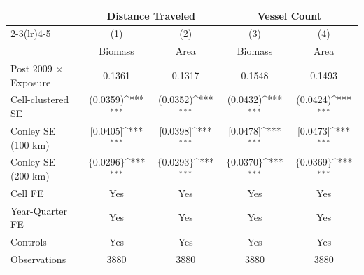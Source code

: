 \def\sym#1{\ifmmode^{#1}\else\(^{#1}\)\fi}
\begin{tabular}{l*{4}{c}}
\toprule
                    &\multicolumn{2}{c}{Distance Traveled}&\multicolumn{2}{c}{Vessel Count}\\
                    \cmidrule(lr){2-3}\cmidrule(lr){4-5}
                    &\multicolumn{1}{c}{(1)}&\multicolumn{1}{c}{(2)}&\multicolumn{1}{c}{(3)}&\multicolumn{1}{c}{(4)}\\
                    &\multicolumn{1}{c}{Biomass}&\multicolumn{1}{c}{Area}&\multicolumn{1}{c}{Biomass}&\multicolumn{1}{c}{Area}\\
\midrule
Post 2009 $\times$ Exposure&0.1361&0.1317&0.1548&0.1493\\
\quad Cell-clustered SE&(0.0359)\sym{***}&(0.0352)\sym{***}&(0.0432)\sym{***}&(0.0424)\sym{***}\\
\quad Conley SE (100 km)&[0.0405]\sym{***}&[0.0398]\sym{***}&[0.0478]\sym{***}&[0.0473]\sym{***}\\
\quad Conley SE (200 km)&$\{$0.0296$\}$\sym{***}&$\{$0.0293$\}$\sym{***}&$\{$0.0370$\}$\sym{***}&$\{$0.0369$\}$\sym{***}\\
\midrule
Cell FE&Yes&Yes&Yes&Yes\\
Year-Quarter FE&Yes&Yes&Yes&Yes\\
Controls&Yes&Yes&Yes&Yes\\
Observations&3880&3880&3880&3880\\
\bottomrule
\end{tabular}
